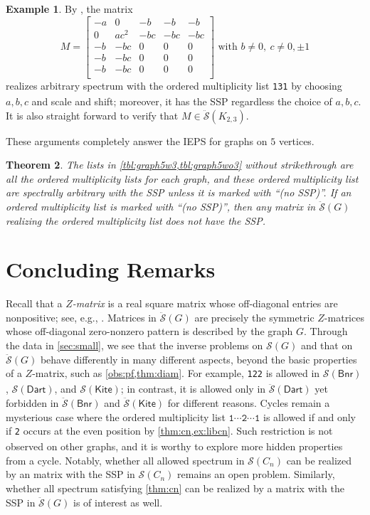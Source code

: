 \documentclass{article}
\newtheorem{theorem}{Theorem}[section]
\theoremstyle{definition}
\newtheorem{example}[theorem]{Example}
\newcommand{\mptn}{\mathcal{S}}
\newcommand{\mdso}{\ddot{\mathcal{S}}}
\newcommand{\Bnr}{\mathsf{Bnr}}
\newcommand{\Dart}{\mathsf{Dart}}
\newcommand{\Kite}{\mathsf{Kite}}
\newcommand{\mtt}[2][]{\texttt{#2}\textsubscript{#1}}
\begin{document}
\begin{example}
\label{ex:k23131}
By \cite{IEPG2}, the matrix 
\[
    M = \begin{bmatrix}
        -a & 0 & -b & -b & -b \\
        0 & ac^2 & -bc & -bc & -bc \\
        -b & -bc & 0 & 0 & 0 \\
        -b & -bc & 0 & 0 & 0 \\
        -b & -bc & 0 & 0 & 0 \\
    \end{bmatrix}
    \text{ with } b\neq 0,\ c\neq 0,\pm1
\]
realizes arbitrary spectrum with the ordered multiplicity list \mtt{131} by choosing $a,b,c$ and scale and shift; moreover, it has the SSP regardless the choice of $a,b,c$.  It is also straight forward to verify that $M\in\mdso(K_{2,3})$.  
\end{example}

These arguments completely answer the IEPS for graphs on $5$ vertices.

\begin{theorem}
\label{thm:graph5}
The lists in \cref{tbl:graph5w3,tbl:graph5wo3} without strikethrough are all the ordered multiplicity lists for each graph, and these ordered multiplicity list are spectrally arbitrary with the SSP unless it is marked with ``(no SSP)''.  If an ordered multiplicity list is marked with ``(no SSP)'', then any matrix in $\mdso(G)$ realizing the ordered multiplicity list does not have the SSP.
\end{theorem}

\section{Concluding Remarks}

Recall that a \emph{$Z$-matrix} is a real square matrix whose off-diagonal entries are nonpositive; see, e.g., \cite{BP94}.  Matrices in $\mdso(G)$ are precisely the symmetric $Z$-matrices whose off-diagonal zero-nonzero pattern is described by the graph $G$.  
Through the data in \cref{sec:small}, we see that the inverse problems on $\mptn(G)$ and that on $\mdso(G)$ behave differently in many different aspects, beyond the basic properties of a $Z$-matrix, such as \cref{obs:pf,thm:diam}. 
For example, \mtt{122} is allowed in $\mptn(\Bnr)$, $\mptn(\Dart)$, and $\mptn(\Kite)$; in contrast, it is allowed only in $\mdso(\Dart)$ yet forbidden in $\mdso(\Bnr)$ and $\mdso(\Kite)$ for different reasons.  Cycles remain a mysterious case where the ordered multiplicity list $\mathtt{1\cdots 2\cdots 1}$ is allowed if and only if \mtt{2} occurs at the even position by \cref{thm:cn,ex:libcn}.  Such restriction is not observed on other graphs, and it is worthy to explore more hidden properties from a cycle.  Notably, whether all allowed spectrum in $\mptn(C_n)$ can be realized by an matrix with the SSP in $\mptn(C_n)$ remains an open problem.  Similarly, whether all spectrum satisfying \cref{thm:cn} can be realized by a matrix with the SSP in $\mdso(G)$ is of interest as well.
\end{document}
